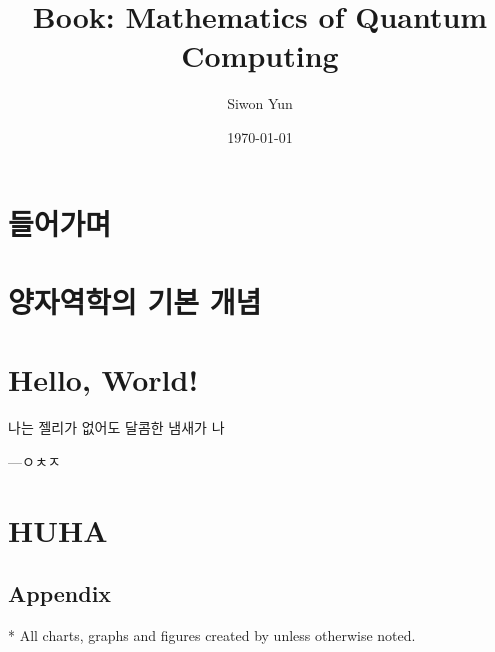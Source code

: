 \documentclass[openany]{book}
\title{Book: Mathematics of Quantum Computing}
\author{Siwon Yun}
\date{\today}
\begin{document}
\maketitle

\toctrue
\tableofcontents
\tocfalse

\newpage

\chapter{들어가며}


\chapter{양자역학의 기본 개념}


\chapter{Hello, World!}

\epigraph{나는 젤리가 없어도 달콤한 냄새가 나}{---ㅇㅊㅈ}
% 	

\chapter{HUHA}
%   

\begin{appendices}
\chapter{Appendix}
%   
\end{appendices}

\toctrue

* All charts, graphs and figures created by \printauthor{} unless otherwise noted.


\tocfalse
\end{document}
